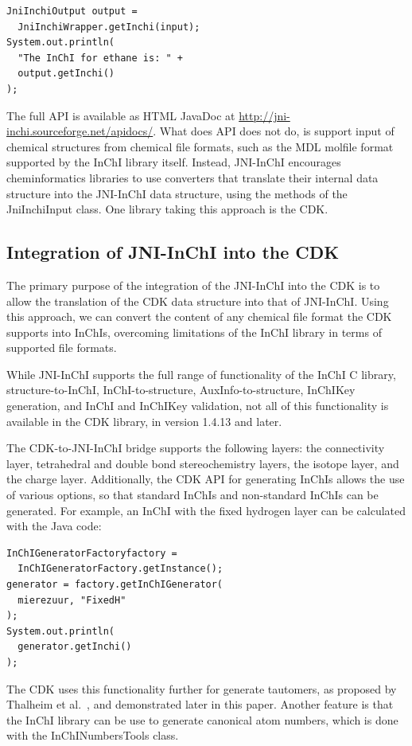 \documentclass[10pt]{bmc_article}
\newenvironment{bmcformat}{\fussy\setboolean{publ}{true}}{\fussy}
\begin{document}
\begin{bmcformat}
\begin{verbatim}
JniInchiOutput output =
  JniInchiWrapper.getInchi(input);
System.out.println(
  "The InChI for ethane is: " +
  output.getInchi()
);
\end{verbatim}

The full API is available as HTML JavaDoc at \url{http://jni-inchi.sourceforge.net/apidocs/}. What does API does not do, is support input of chemical
structures from chemical file formats, such as the MDL molfile format supported by the InChI library itself.
Instead, JNI-InChI encourages cheminformatics libraries to use converters that translate their internal
data structure into the JNI-InChI data structure, using the methods of the JniInchiInput class.
One library taking this approach is the CDK.

\subsection*{Integration of JNI-InChI into the CDK}

The primary purpose of the integration of the JNI-InChI into the CDK is to allow the translation of the
CDK data structure into that of JNI-InChI. Using this approach, we can convert the content of any chemical
file format the CDK supports into InChIs, overcoming limitations of the InChI library in terms of supported
file formats.

While JNI-InChI supports the full range of functionality of the InChI C library, structure-to-InChI, InChI-to-structure,
AuxInfo-to-structure, InChIKey generation, and InChI and InChIKey validation, not all of this functionality is available in the
CDK library, in version 1.4.13 and later.

The CDK-to-JNI-InChI bridge supports the following layers: the connectivity layer, tetrahedral and double bond stereochemistry layers, the isotope layer, and the charge layer. Additionally, the CDK API for generating InChIs allows the
use of various options, so that standard InChIs and non-standard InChIs can be generated. For example,
an InChI with the fixed hydrogen layer can be calculated with the Java code:

\begin{verbatim}
InChIGeneratorFactoryfactory =
  InChIGeneratorFactory.getInstance();
generator = factory.getInChIGenerator(
  mierezuur, "FixedH"
);
System.out.println(
  generator.getInchi()
);
\end{verbatim}

The CDK uses this functionality further for generate tautomers, as proposed by Thalheim et al.~\cite{Thalheim2010},
and demonstrated later in this paper. Another feature is that the InChI library can be use to generate canonical
atom numbers, which is done with the InChINumbersTools class.


\end{bmcformat}
\end{document}
